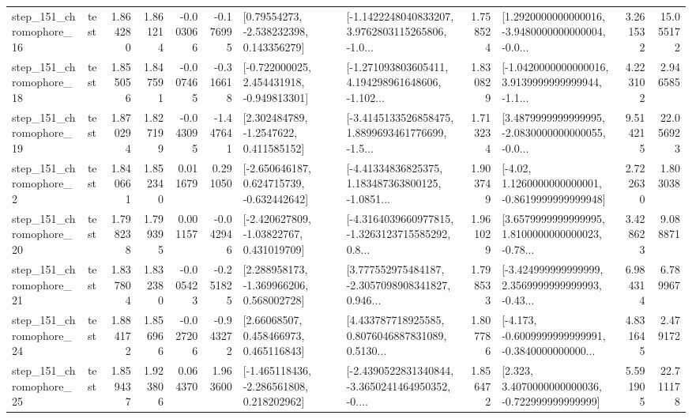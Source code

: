 \begin{tabular}{llrrrrllrlrr}
  step\_151\_chromophore\_16 &      test &      1.864280 &    1.861214 &     -0.003066 & -0.176995 &     [0.79554273, -2.538232398, 0.143356279] &  [-1.1422248040833207, 3.9762803115265806, -1.0... &       1.758524 &  [1.2920000000000016, -3.9480000000000004, -0.0... &            3.261532 &         15.055172 \\
  step\_151\_chromophore\_18 &      test &      1.855056 &    1.847591 &     -0.007465 & -0.316618 &   [-0.722000025, 2.454431918, -0.949813301] &  [-1.271093803605411, 4.194298961648606, -1.102... &       1.830829 &  [-1.0420000000000016, 3.9139999999999944, -1.1... &            4.223102 &          2.946585 \\
  step\_151\_chromophore\_19 &      test &      1.870294 &    1.827199 &     -0.043095 & -1.447641 &      [2.302484789, -1.2547622, 0.411585152] &  [-3.4145133526858475, 1.8899693461776699, -1.5... &       1.713234 &  [3.4879999999999995, -2.0830000000000055, -0.0... &            9.514215 &         22.056923 \\
   step\_151\_chromophore\_2 &      test &      1.840661 &    1.852340 &      0.011679 &  0.291050 &   [-2.650646187, 0.624715739, -0.632442642] &  [-4.41334836825375, 1.183487363800125, -1.0851... &       1.903749 &   [-4.02, 1.1260000000000001, -0.8619999999999948] &            2.722630 &          1.803038 \\
  step\_151\_chromophore\_20 &      test &      1.798238 &    1.799395 &      0.001157 & -0.042946 &    [-2.420627809, -1.03822767, 0.431019709] &  [-4.3164039660977815, -1.3263123715585292, 0.8... &       1.961029 &  [3.6579999999999995, 1.8100000000000023, -0.78... &            3.428623 &          9.088871 \\
  step\_151\_chromophore\_21 &      test &      1.837804 &    1.832380 &     -0.005423 & -0.251825 &    [2.288958173, -1.369966206, 0.568002728] &  [3.777552975484187, -2.3057098908341827, 0.946... &       1.798533 &  [-3.424999999999999, 2.3569999999999993, -0.43... &            6.984314 &          6.789967 \\
  step\_151\_chromophore\_24 &      test &      1.884172 &    1.856966 &     -0.027206 & -0.943272 &      [2.66068507, 0.458466973, 0.465116843] &  [4.433787718925585, 0.8076046887831089, 0.5130... &       1.807786 &  [-4.173, -0.6009999999999991, -0.3840000000000... &            4.831645 &          2.479172 \\
  step\_151\_chromophore\_25 &      test &      1.859437 &    1.923806 &      0.064370 &  1.963600 &   [-1.465118436, -2.286561808, 0.218202962] &  [-2.4390522831340844, -3.3650241464950352, -0.... &       1.856472 &    [2.323, 3.4070000000000036, -0.722999999999999] &            5.591905 &         22.711178 \\

\end{tabular}
